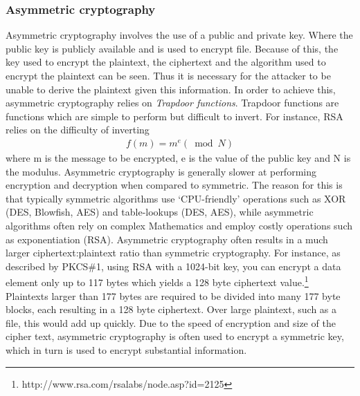 \documentclass[12pt, titlepage]{article}
\begin{document}
\subsubsection*{Asymmetric cryptography}
Asymmetric cryptography involves the use of a public and private key. Where the public key is publicly available and is used to encrypt file. Because of this, the key used to encrypt the plaintext, the ciphertext and the algorithm used to encrypt the plaintext can be seen. Thus it is necessary for the attacker to be unable to derive the plaintext given this information. In order to achieve this, asymmetric cryptography relies on \textit{Trapdoor functions}. Trapdoor functions are functions which are simple to perform but difficult to invert. For instance, RSA relies on the difficulty of inverting
\begin{align*}
f(m) = m^e (\bmod N)
\end{align*}
where m is the message to be encrypted, e is the value of the public key and N is the modulus.
\newline \indent Asymmetric cryptography is generally slower at performing encryption and decryption when compared to symmetric. The reason for this is that typically symmetric algorithms use `CPU-friendly' operations such as XOR (DES, Blowfish, AES) and table-lookups (DES, AES), while asymmetric algorithms often rely on complex Mathematics and employ costly operations such as exponentiation (RSA).
\newline \indent Asymmetric cryptography often results in a much larger ciphertext:plaintext ratio than symmetric cryptography. For instance, as described by PKCS\#1, using RSA with a 1024-bit key, you can encrypt a data element only up to 117 bytes which yields a 128 byte ciphertext value.\footnote{http://www.rsa.com/rsalabs/node.asp?id=2125} Plaintexts larger than 177 bytes are required to be divided into many 177 byte blocks, each resulting in a 128 byte ciphertext. Over large plaintext, such as a file, this would add up quickly.
\newline \indent Due to the speed of encryption and size of the cipher text, asymmetric cryptography is often used to encrypt a symmetric key, which in turn is used to encrypt substantial information.
\end{document}
